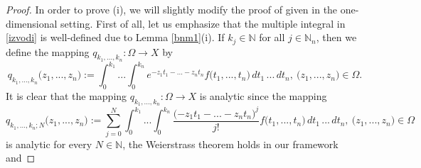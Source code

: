 \documentclass{amsart}
\theoremstyle{definition}
\theoremstyle{remark}
\numberwithin{equation}{section}
\begin{document}
\begin{proof} 
In order to prove (i), we will slightly modify the proof of \cite[Theorem 1.5.1]{a43} given in the one-dimensional setting.
First of all, let us emphasize that the multiple integral in \eqref{izvodi} is well-defined due to Lemma \ref{bnm1}(i). If $k_{j}\in {\mathbb N}$ for all $j\in {\mathbb N}_{n}$, then we define the mapping $q_{k_{1},...,k_{n}} : \Omega \rightarrow X$ by{\small
$$
q_{k_{1},...,k_{n}}\bigl(z_{1},...,z_{n}\bigr):=\int^{k_{1}}_{0}...\int^{k_{n}}_{0}e^{-z_{1}t_{1}-...-z_{n}t_{n}} f\bigl(t_{1},...,t_{n}\bigr)\, dt_{1}\, ...\, dt_{n},\ \bigl(z_{1},...,z_{n}\bigr)\in \Omega.
$$}
It is clear that the mapping $q_{k_{1},...,k_{n}} : \Omega \rightarrow X$ is analytic since the mapping
{\tiny
$$
q_{k_{1},...,k_{n};N}\bigl(z_{1},...,z_{n}\bigr):=\sum_{j=0}^{N}\int^{k_{1}}_{0}...\int^{k_{n}}_{0}\frac{(-z_{1}t_{1}-...-z_{n}t_{n}\bigr)^{j}}{j!} f\bigl(t_{1},...,t_{n}\bigr)\, dt_{1}\, ...\, dt_{n},\ \bigl(z_{1},...,z_{n}\bigr)\in \Omega
$$}
is analytic for every $N\in {\mathbb N}$, the Weierstrass theorem holds in our framework and 


\end{proof}
\end{document}
